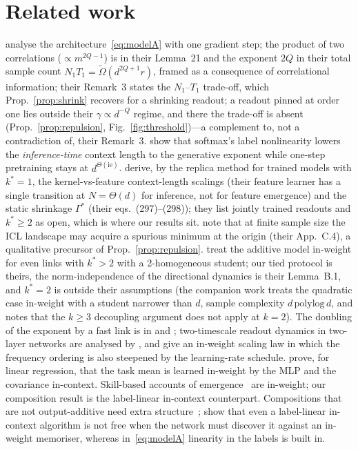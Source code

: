\section{Related work}
\label{sec:related}
\citet{oko2024pretrained} analyse the architecture~\eqref{eq:modelA} with one gradient step; the product of two correlations
($\propto m^{2Q-1}$) is in their Lemma~21 and the exponent $2Q$ in their total sample count $N_1T_1=\tilde\Omega(d^{2Q+1}r)$, framed as a
consequence of correlational information; their Remark~3 states the $N_1$--$T_1$ trade-off, which Prop.~\ref{prop:shrink} recovers for a shrinking readout; a readout pinned at order one lies outside their $\gamma\propto d^{-Q}$ regime, and there the trade-off is absent (Prop.~\ref{prop:repulsion}, Fig.~\ref{fig:threshold})---a complement to, not a contradiction of, their Remark~3. \citet{nishikawa2025nonlinear} show that softmax's label
nonlinearity lowers the \emph{inference-time} context length to the generative exponent while one-step pretraining stays at
$d^{\Theta(\mathrm{ie})}$. \citet{gu2026incontext} derive, by the replica method for trained models with $k^*=1$, the kernel-vs-feature
context-length scalings (their feature learner has a single transition at $N=\Theta(d)$ for
inference, not for feature emergence) and the static shrinkage $\Gamma^*$ (their eqs.~(297)--(298)); they list jointly trained readouts
and $k^*\ge2$ as open, which is where our results sit. \citet{kim2024transformers} note that at finite sample size the ICL landscape may acquire a spurious minimum at the
origin (their App.~C.4), a qualitative precursor of Prop.~\ref{prop:repulsion}. \citet{ren2025emergence} treat the additive model
in-weight for even links with $k^*>2$ with a 2-homogeneous student; our tied protocol is theirs, the norm-independence of the
directional dynamics is their Lemma~B.1, and $k^*=2$ is outside their assumptions (the companion work \citet{benarous2025quadratic} treats the quadratic case in-weight with a student
narrower than $d$, sample complexity $d\,\mathrm{polylog}\,d$, and notes that the $k\ge3$ decoupling argument does not apply at $k=2$). The doubling of the exponent by a fast link is in \citet[\S5]{bietti2023learning} and \citet{bietti2022learning}; two-timescale
readout dynamics in two-layer networks are analysed by \citet{berthier2023learning}, and \citet[Cor.~2.3]{ren2025emergence} give an
in-weight scaling law in which the frequency ordering is also steepened by the learning-rate schedule.
\citet{zhang2024incontext} prove, for linear regression, that the task mean is learned in-weight by the MLP and the covariance
in-context. Skill-based accounts of emergence~\citep{michaud2023quantization,nam2024exactly,arora2023theory,okawa2023compositional}
are in-weight; our composition result is the label-linear in-context counterpart. Compositions that are not output-additive need extra structure~\citep{kobayashi2024compositional,wang2026power}; \citet{he2024learning}
show that even a label-linear in-context algorithm is not free when the network must discover it against an in-weight memoriser,
whereas in~\eqref{eq:modelA} linearity in the labels is built in.

